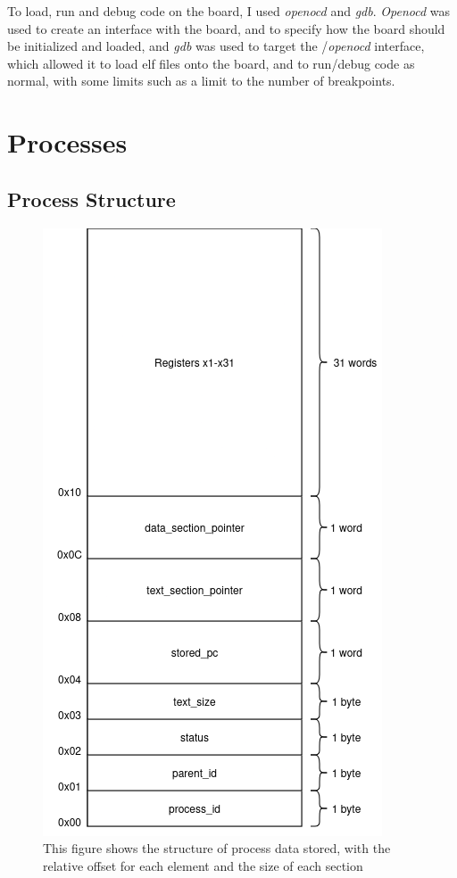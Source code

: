 To load, run and debug code on the board, I used \textit{openocd} and \textit{gdb}. \textit{Openocd} was used to create an interface with the board, and to specify how the board should be initialized and loaded, and \textit{gdb} was used to target the /\textit{openocd} interface, which allowed it to load elf files onto the board, and to run/debug code as normal, with some limits such as a limit to the number of breakpoints.

\section{Processes}
\subsection{Process Structure}
\begin{figure}[H]
    \includegraphics[height=0.6\textheight]{figures/process_structure.png}
    \centering
    \caption[Process Structure]{This figure shows the structure of process data stored, with the relative offset for each element and the size of each section}
    \label{fig:proc_struc}
\end{figure}
